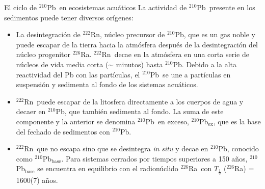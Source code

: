 \documentclass[9pt]{beamer}
\newcommand{\Ra}{$^{226}$Ra}
\newcommand{\PbCero}{$^{210}$Pb}
\newcommand{\PbCeroEx}{$^{210}$Pb$_\text{ex}$}
\newcommand{\Rn}{$^{222}$Rn}
\begin{document}
\begin{frame}[noframenumbering, label=Ciclo]{El ciclo de \PbCero\, en ecosistemas acuáticos}
La actividad de \PbCero\, presente en los sedimentos puede tener diversos orígenes:
\begin{itemize}
\justifying
\item La desintegración de \Rn, núcleo precursor de \PbCero, que es un gas noble y puede escapar de la tierra hacia la atmósfera después de la desintegración del núcleo progenitor \Ra. \Rn\, decae en la atmósfera en una corta serie de núcleos de vida media corta ($\sim$ minutos) hasta \PbCero. Debido a la alta reactividad del Pb con las partículas, el \PbCero\, se une a partículas en suspensión y sedimenta al fondo de los sistemas acuáticos.  
\item \Rn\, puede escapar de la litosfera directamente a los cuerpos de agua y decaer en \PbCero, que también sedimenta al fondo. La suma de este componente y la anterior se denomina \PbCero\, en exceso, \PbCeroEx, que es la base del fechado de sedimentos con \PbCero.
\item \Rn\, que no escapa sino que se desintegra \textit{in situ} y decae en \PbCero, conocido como $^{210}$Pb$_\text{base}$. Para sistemas cerrados por tiempos superiores a 150 años, $^{210}$Pb$_\text{base}$ se encuentra en equilibrio con el radionúclido \Ra\, con $T_{\frac{1}{2}}$ (\Ra) = 1600(7) años. 
\end{itemize}
	\begin{flushright}
	\hyperlink{Portada}{}
	\end{flushright}
\end{frame}


\end{document}
